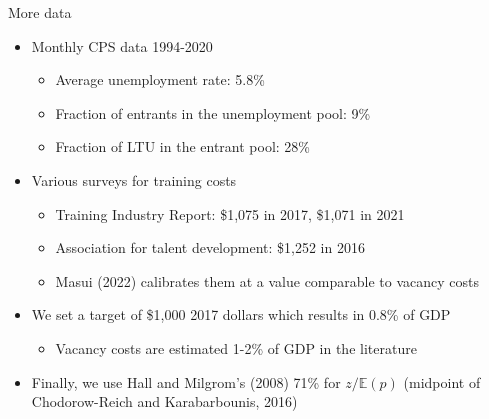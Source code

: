 \documentclass[9pt,xcolor={svgnames}]{beamer}
\begin{document}
\begin{frame}{More data}
\begin{itemize}
\setlength\itemsep{1.8em} 
   
    \item Monthly CPS data 1994-2020
    \smallskip
    \begin{itemize}
        \item Average unemployment rate: 5.8\%
        \item Fraction of entrants in the unemployment pool: 9\%
        \item Fraction of LTU in the entrant pool: 28\%
    \end{itemize}

    \item Various surveys for training costs
    \smallskip
    \begin{itemize}
        \item Training Industry Report: \$1,075 in 2017, \$1,071 in 2021
        \item Association for talent development: \$1,252 in 2016
        \item Masui (2022) calibrates them at a value comparable to vacancy costs 
    \end{itemize}

    \item We set a target of \$1,000 2017 dollars which results in 0.8\% of GDP
    \smallskip
    \begin{itemize}
        \item Vacancy costs are estimated 1-2\% of GDP in the literature
    \end{itemize} 

    \item Finally, we use Hall and Milgrom's (2008) 71\% for $z/\mathbb{E}(p)$ (midpoint of Chodorow-Reich and Karabarbounis, 2016)
\end{itemize}
\end{frame}
\end{document}
